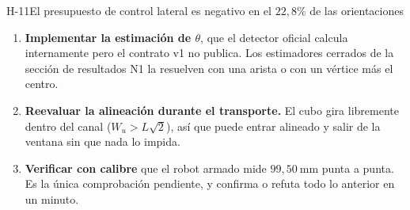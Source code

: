 \documentclass[11pt,a4paper]{article}
\newcommand{\grados}{^{\circ}}
\begin{document}
\begin{hallazgo}{H-11}{El presupuesto de control lateral es negativo en el $22{,}8\%$ de las orientaciones}
\begin{enumerate}[label=(\alph*),leftmargin=2em,itemsep=1pt,topsep=2pt]
      $90\grados$, hay cuatro direcciones admisibles y la restricción cuesta poco en
      planificación.
\item \textbf{Implementar la estimación de $\theta$}, que el detector oficial calcula
      internamente pero el contrato v1 no publica. Los estimadores cerrados de la sección
      de resultados N1 la resuelven con una arista o con un vértice más el centro.
\item \textbf{Reevaluar la alineación durante el transporte.} El cubo gira libremente
      dentro del canal ($W_u > L\sqrt2$), así que puede entrar alineado y salir de la
      ventana sin que nada lo impida.
\item \textbf{Verificar con calibre} que el robot armado mide $99{,}50\ \mathrm{mm}$
      punta a punta. Es la única comprobación pendiente, y confirma o refuta todo lo
      anterior en un minuto.
\end{enumerate}
\end{hallazgo}
\end{document}
